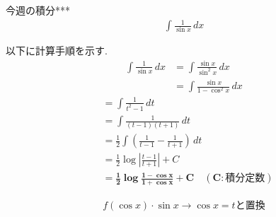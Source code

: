\documentclass[main]{subfiles}
\begin{document}

\begin{mondai}{5}{今週の積分}{***}
    \begin{align*}
        \int \frac{1}{\sin x} \, dx
    \end{align*}
\end{mondai}


\solutionhead
\hfill
以下に計算手順を示す.
\hfill\
\begin{align*}
    \int \frac{1}{\sin x} \, dx
        &= \int \frac{\sin x}{\sin^2 x} \, dx \\
        &= \int \frac{\sin x}{1-\cos^2 x} \, dx
\end{align*}
\begin{align*}
        &= \int \frac{1}{t^2-1} \, dt \\
        &= \int \frac{1}{(t-1)(t+1)} \, dt \\
        &= \frac{1}{2}\int \left(\frac{1}{t-1}-\frac{1}{t+1}\right) \, dt \\
        &= \frac{1}{2} \log \left|\frac{t-1}{t+1}\right|+C  \\
        &= \boldsymbol{\frac{1}{2} \log \frac{1-\cos x}{1+\cos x}+C \quad (C:\textbf{積分定数})}
\end{align*}

\begin{focusbox}
\centering
\vspace*{-0.9\baselineskip}
\begin{align*}
    f(\cos x)\cdot \sin x \rightarrow \cos x = t \text{と置換}
\end{align*}
\end{focusbox}
\end{document}
